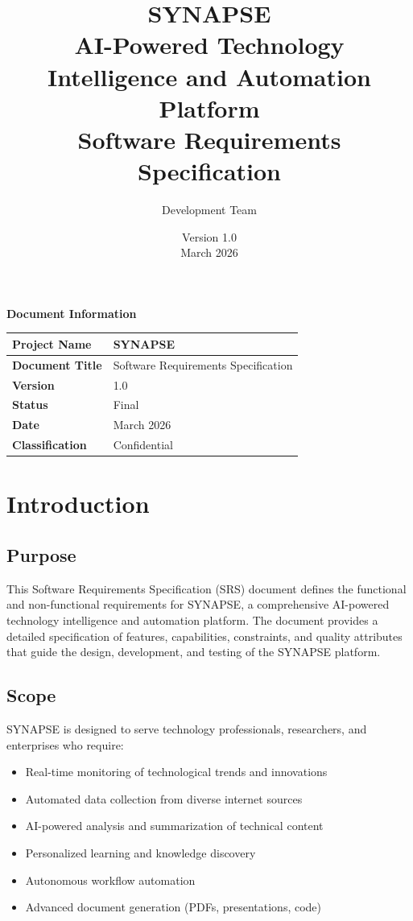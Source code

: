 \documentclass{report}
\title{\textbf{SYNAPSE} \\ \large AI-Powered Technology Intelligence and Automation Platform \\ Software Requirements Specification}
\author{Development Team}
\date{Version 1.0 \\ March 2026}
\begin{document}
\maketitle

\begin{center}
    \vspace{2cm}
    \Large \textbf{Document Information} \\
    \vspace{1cm}
    \begin{tabular}{|l|l|}
    \hline
    \textbf{Project Name} & SYNAPSE \\
    \hline
    \textbf{Document Title} & Software Requirements Specification \\
    \hline
    \textbf{Version} & 1.0 \\
    \hline
    \textbf{Status} & Final \\
    \hline
    \textbf{Date} & March 2026 \\
    \hline
    \textbf{Classification} & Confidential \\
    \hline
    \end{tabular}
\end{center}

\newpage
\tableofcontents
\newpage

\chapter{Introduction}

\section{Purpose}
This Software Requirements Specification (SRS) document defines the functional and non-functional requirements for SYNAPSE, a comprehensive AI-powered technology intelligence and automation platform. The document provides a detailed specification of features, capabilities, constraints, and quality attributes that guide the design, development, and testing of the SYNAPSE platform.

\section{Scope}
SYNAPSE is designed to serve technology professionals, researchers, and enterprises who require:
\begin{itemize}
    \item Real-time monitoring of technological trends and innovations
    \item Automated data collection from diverse internet sources
    \item AI-powered analysis and summarization of technical content
    \item Personalized learning and knowledge discovery
    \item Autonomous workflow automation
    \item Advanced document generation (PDFs, presentations, code)
\end{itemize}
\end{document}
